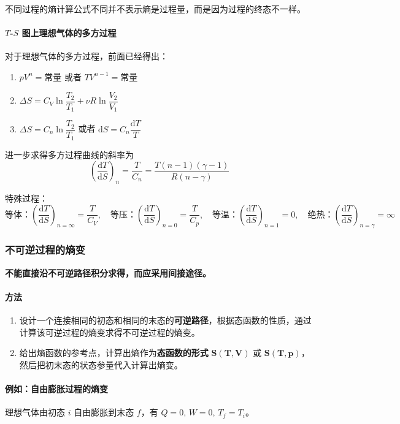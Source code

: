 \documentclass[UTF8]{ctexart}
\begin{document}
不同过程的熵计算公式不同并不表示熵是过程量，而是因为过程的终态不一样。

\paragraph{$T$-$S$ 图上理想气体的多方过程}
对于理想气体的多方过程，前面已经得出：
\begin{enumerate}[leftmargin=2em]
  \item $pV^n=\text{常量}$ 或者 $TV^{n-1}=\text{常量}$
  \item $\Delta S=C_V\ln\dfrac{T_2}{T_1}+\nu R\ln\dfrac{V_2}{V_1}$
  \item $\Delta S=C_n\ln\dfrac{T_2}{T_1}$ 或者 $\mathrm{d}S=C_n\dfrac{\mathrm{d}T}{T}$
\end{enumerate}

进一步求得多方过程曲线的斜率为
\[
\left(\frac{\mathrm{d}T}{\mathrm{d}S}\right)_n=\frac{T}{C_n}
=\frac{T(n-1)(\gamma-1)}{R(n-\gamma)}
\]

特殊过程：
\[
\text{等体：}\left(\frac{\mathrm{d}T}{\mathrm{d}S}\right)_{n=\infty}=\frac{T}{C_V},\quad
\text{等压：}\left(\frac{\mathrm{d}T}{\mathrm{d}S}\right)_{n=0}=\frac{T}{C_p},\quad
\text{等温：}\left(\frac{\mathrm{d}T}{\mathrm{d}S}\right)_{n=1}=0,\quad
\text{绝热：}\left(\frac{\mathrm{d}T}{\mathrm{d}S}\right)_{n=\gamma}=\infty
\]

\subsubsection{不可逆过程的熵变}

\textbf{不能直接沿不可逆路径积分求得，而应采用间接途径。}

\paragraph{方法}
\begin{enumerate}[leftmargin=2em]
  \item 设计一个连接相同的初态和相同的末态的\textbf{可逆路径}，根据态函数的性质，通过计算该可逆过程的熵变求得不可逆过程的熵变。
  \item 给出熵函数的参考点，计算出熵作为\textbf{态函数的形式} $\boldsymbol{S(T,V)}$ 或 $\boldsymbol{S(T,p)}$，然后把初末态的状态参量代入计算出熵变。
\end{enumerate}

\paragraph{例如：自由膨胀过程的熵变}
理想气体由初态 $i$ 自由膨胀到末态 $f$，有 $Q=0,\,W=0,\,T_f=T_i$。
\end{document}
